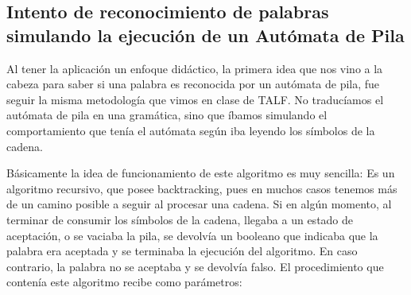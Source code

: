 \documentclass[12pt,a4paper,spanish]{book}
\begin{document}
\subsection{Intento de reconocimiento de palabras simulando la ejecuci\'on de un Aut\'omata de Pila}
Al tener la aplicaci\'on un enfoque did\'actico, la primera idea que nos vino a la cabeza para saber si una palabra es reconocida por un aut\'omata de pila, fue seguir la misma metodolog\'ia que vimos en clase de TALF. No traduc\'iamos el aut\'omata de pila en una gram\'atica, sino que \'ibamos simulando el comportamiento que ten\'ia el aut\'omata seg\'un iba leyendo los s\'imbolos de la cadena.

B\'asicamente la idea de funcionamiento de este algoritmo es muy sencilla: Es un algoritmo recursivo, que posee backtracking, pues en muchos casos tenemos m\'as de un camino posible a seguir al procesar una cadena. Si en alg\'un momento, al terminar de consumir los s\'imbolos de la cadena, llegaba a un estado de aceptaci\'on, o se vaciaba la pila, se devolv\'ia un booleano que indicaba que la palabra era aceptada y se terminaba la ejecuci\'on del algoritmo. En caso contrario, la palabra no se aceptaba y se devolv\'ia falso.
El procedimiento que conten\'ia este algoritmo recibe como par\'ametros:
\end{document}
